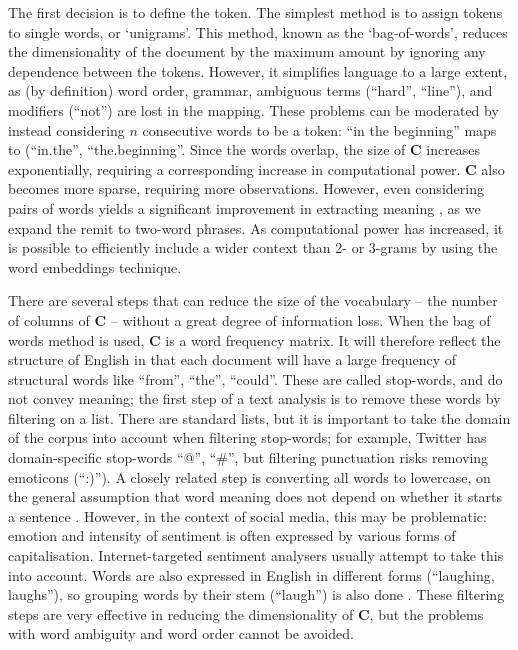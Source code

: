 \documentclass[12pt,a4]{article}
\begin{document}
The first decision is to define the token. The simplest method is to assign tokens to single words, or `unigrams'. This method, known as the `bag-of-words', reduces the dimensionality of the document by the maximum amount by ignoring any dependence between the tokens. However, it simplifies language to a large extent, as (by definition) word order, grammar, ambiguous terms (``hard'', ``line''), and modifiers (``not'') are lost in the mapping. These problems can be moderated by instead considering \(n\) consecutive words to be a token: ``in the beginning'' maps to (``in.the'', ``the.beginning''. Since the words overlap, the size of \(\mathbf{C}\) increases exponentially, requiring a corresponding increase in computational power. \(\mathbf{C}\) also becomes more sparse, requiring more observations. However, even considering pairs of words yields a significant improvement in extracting meaning \parencite{chengNgramSkipgramConcgram2006}, as we expand the remit to two-word phrases. As computational power has increased, it is possible to efficiently include a wider context than 2- or 3-grams by using the word embeddings technique.

There are several steps that can reduce the size of the vocabulary -- the number of columns of \(\mathbf{C}\) -- without a great degree of information loss. When the bag of words method is used, \(\mathbf{C}\) is a word frequency matrix. It will therefore reflect the structure of English in that each document will have a large frequency of structural words like ``from'', ``the'', ``could''. These are called stop-words, and do not convey meaning; the first step of a text analysis is to remove these words by filtering on a list. There are standard lists, but it is important to take the domain of the corpus into account when filtering stop-words; for example, Twitter has domain-specific stop-words ``@'', ``\#'', but filtering punctuation risks removing emoticons (``:)''). A closely related step is converting all words to lowercase, on the general assumption that word meaning does not depend on whether it starts a sentence \parencite{dennyTextPreprocessingUnsupervised2018}. However, in the context of social media, this may be problematic: emotion and intensity of sentiment is often expressed by various forms of capitalisation. Internet-targeted sentiment analysers usually attempt to take this into account. Words are also expressed in English in different forms (``laughing, laughs''), so grouping words by their stem (``laugh'') is also done \parencite{porterAlgorithmSuffixStripping1980}. These filtering steps are very effective in reducing the dimensionality of \(\mathbf{C}\), but the problems with word ambiguity and word order cannot be avoided.  
\end{document}
